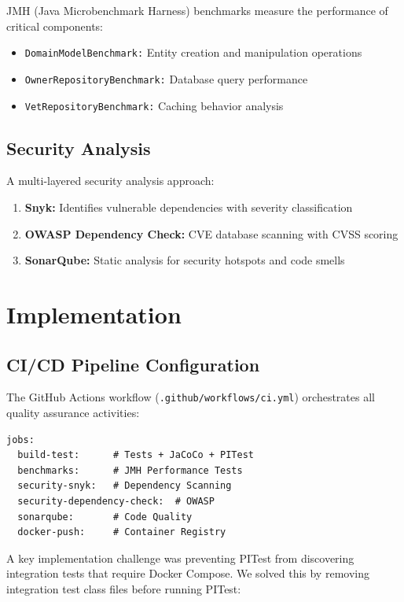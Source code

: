 \documentclass[sigconf]{acmart}
\begin{document}
JMH (Java Microbenchmark Harness) benchmarks measure the performance of critical components:
\begin{itemize}
    \item \texttt{DomainModelBenchmark:} Entity creation and manipulation operations
    \item \texttt{OwnerRepositoryBenchmark:} Database query performance
    \item \texttt{VetRepositoryBenchmark:} Caching behavior analysis
\end{itemize}

\subsection{Security Analysis}

A multi-layered security analysis approach:
\begin{enumerate}
    \item \textbf{Snyk:} Identifies vulnerable dependencies with severity classification
    \item \textbf{OWASP Dependency Check:} CVE database scanning with CVSS scoring
    \item \textbf{SonarQube:} Static analysis for security hotspots and code smells
\end{enumerate}

\section{Implementation}

\subsection{CI/CD Pipeline Configuration}

The GitHub Actions workflow (\texttt{.github/workflows/ci.yml}) orchestrates all quality assurance activities:

\begin{lstlisting}[style=yamlstyle, caption={CI Pipeline Structure}]
jobs:
  build-test:      # Tests + JaCoCo + PITest
  benchmarks:      # JMH Performance Tests
  security-snyk:   # Dependency Scanning
  security-dependency-check:  # OWASP
  sonarqube:       # Code Quality
  docker-push:     # Container Registry
\end{lstlisting}

A key implementation challenge was preventing PITest from discovering integration tests that require Docker Compose. We solved this by removing integration test class files before running PITest:
\end{document}
